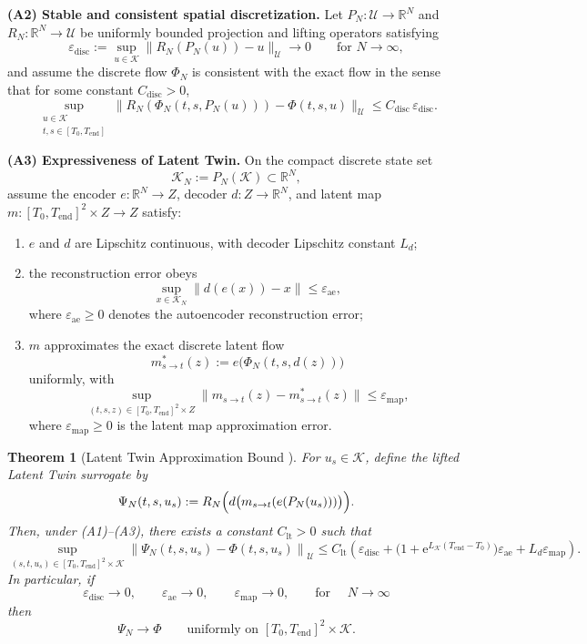 \documentclass[a4paper,fleqn]{cas-sc}
\theoremstyle{thmstyleone}%
\newtheorem{theorem}{Theorem}%
\theoremstyle{thmstyletwo}%
\theoremstyle{thmstylethree}%
\begin{document}
\smallskip\noindent
\textbf{(A2) Stable and consistent spatial discretization.}
Let $P_N:\mathcal{U}\to\mathbb{R}^N$ and $R_N:\mathbb{R}^N\to\mathcal{U}$ be uniformly bounded projection and lifting operators satisfying
$$
\varepsilon_{\mathrm{disc}} := \sup_{u\in\mathcal{K}} \|R_N(P_N(u))-u\|_{\mathcal {U}}\to 0 \qquad \text{for } N\to\infty,
$$
and assume the discrete flow $\Phi_N$ is consistent with the exact flow in the sense that for some constant $C_{\mathrm{disc}}>0$,
$$
\sup_{\substack{u\in\mathcal{K}\\ t,s\in[T_0,T_{\mathrm{end}}]}} \|R_N(\Phi_N(t,s,P_N(u))) - \Phi(t,s,u)\|_{\mathcal{U}} \leq C_{\mathrm{disc}} \, \varepsilon_{\mathrm{disc}}.
$$

\smallskip \noindent
\textbf{(A3) Expressiveness of Latent Twin.}
On the compact discrete state set
$$
\mathcal{K}_N:=P_N(\mathcal{K})\subset\mathbb{R}^N,
$$
assume the encoder $e:\mathbb{R}^N\to Z$, decoder $d:Z\to\mathbb{R}^N$, and latent map $m:[T_0,T_{\mathrm{end}}]^2\times Z \to Z$ satisfy:
\begin{enumerate}
    \item $e$ and $d$ are Lipschitz continuous, with decoder Lipschitz constant $L_{d}$;
    \item the reconstruction error obeys
    $$
    \sup_{x\in\mathcal{K}_N} \|d(e(x))-x\|
    \leq \varepsilon_{\mathrm{ae}},
    $$
    where $\varepsilon_{\mathrm{ae}} \geq 0$ denotes the autoencoder reconstruction error;
    \item $m$ approximates the exact discrete latent flow
    $$
    m^\ast_{s\to t}(z):= e\bigl(\Phi_N(t,s,d(z))\bigr)
    $$ uniformly, with
    $$
    \sup_{(t,s,z)\in [T_0,T_{\mathrm{end}}]^2\times Z} \|m_{s\to t}(z)-m^\ast_{s\to t}(z)\| \leq \varepsilon_{\mathrm{map}},
    $$
    where $\varepsilon_{\mathrm{map}} \geq 0$ is the latent map approximation error.
\end{enumerate}

\begin{theorem}[Latent Twin Approximation Bound {\cite[Theorem~2]{chung2026latent}}]
\label{thm:lt-pde}
For $u_s\in\mathcal{K}$, define the lifted Latent Twin surrogate by
$$
\Psi_{N}(t,s,u_s) :=
R_N\Bigl( d\bigl(m_{s\to t} (e(P_N(u_s)))\bigr)\Bigr).
$$
Then, under \textup{(A1)--(A3)}, there exists a constant $C_{\mathrm{lt}}>0$ such that
$$
\sup_{(s,t,u_s)\in[T_0,T_{\mathrm{end}}]^2\times\mathcal{K}}
\left\| \Psi_{N}(t, s,u_s) -\Phi(t,s,u_s) \right\|_{\mathcal U}
\leq
C_{\mathrm{lt}}
\left(
\varepsilon_{\mathrm{disc}}
+
\bigl(1+\mathrm{e}^{L_{\mathcal K}(T_{\mathrm{end}}-T_0)}\bigr)\varepsilon_{\mathrm{ae}}
+
L_{d}\varepsilon_{\mathrm{map}}
\right).
$$
In particular, if
$$
\varepsilon_{\mathrm{disc}}\to 0, \qquad
\varepsilon_{\mathrm{ae}}\to 0, \qquad
\varepsilon_{\mathrm{map}}\to 0, \qquad \text{for } \quad N \to \infty
$$
then
$$
\Psi_{N}\to \Phi
\qquad
\text{uniformly on } [T_0,T_{\mathrm{end}}]^2\times\mathcal{K}.
$$
\end{theorem}
\end{document}
